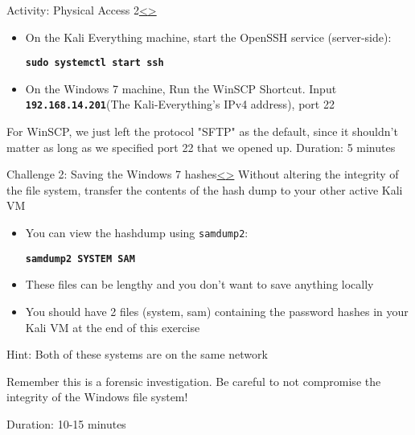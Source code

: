 \documentclass[12pt]{article}
\newcommand{\code}[1]{\texttt{\bfseries#1}}
\newenvironment{instructionblock}{\Large\bgroup}{\egroup}
\newcommand{\bi}{\begin{itemize}}
\newcommand{\ei}{\end{itemize}}
\begin{document}
\pagebreak
\begin{slide}{Activity: Physical Access 2}{\hyperref[slide 14]{\textless}\hyperref[slide 16]{\textgreater}}
	\begin{instructionblock}
		\bi
			\item On the Kali Everything machine, start the OpenSSH service (server-side):
		
			\code{sudo systemctl start ssh}
			
			\item On the Windows 7 machine, Run the WinSCP Shortcut. Input \code{192.168.14.201}(The Kali-Everything's IPv4 address), port 22
		\ei
		
	\end{instructionblock}
\end{slide}
For WinSCP, we just left the protocol "SFTP" as the default, since it shouldn't matter as long as we specified port 22 that we opened up.
\vfill
Duration: 5 minutes

\pagebreak
\begin{slide}{Challenge 2: Saving the Windows 7 hashes}{\hyperref[slide 15]{\textless}\hyperref[slide 17]{\textgreater}}
	\begin{instructionblock}
		Without altering the integrity of the file system, transfer the contents of the hash dump to your other active Kali VM
		\bi
			\item You can view the hashdump using \texttt{samdump2}:
			
			\code{samdump2 SYSTEM SAM}
			
			\item These files can be lengthy and you don't want to save anything locally
			
			\item You should have 2 files (system, sam) containing the password hashes in your Kali VM at the end of this exercise
		\ei

	\end{instructionblock}
\end{slide}
Hint: Both of these systems are on the same network

Remember this is a forensic investigation. Be careful to not compromise the integrity of the Windows file system!

\vfill 
Duration: 10-15 minutes
\end{document}
